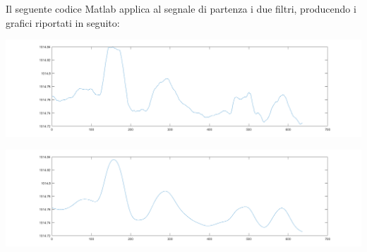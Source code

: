 \documentclass[a4paper]{article}
\begin{document}
Il seguente codice Matlab applica al segnale di partenza i due filtri, producendo i grafici riportati in seguito: \\

\makebox[\linewidth]{}
\makebox[\linewidth]{}
\begin{minipage}{\linewidth}
\begin{center}
\includegraphics[width=160mm,scale=0.7]{./images/segnali/pressure_phone_movmean.png} 
\end{center}
\end{minipage}
\makebox[\linewidth]{}
\makebox[\linewidth]{}
\makebox[\linewidth]{}
\makebox[\linewidth]{}
\begin{minipage}{\linewidth}
\begin{center}
\includegraphics[width=160mm,scale=0.2]{./images/segnali/pressure_phone_gauss.png} 
\end{center}
\end{minipage}



\clearpage

\end{document}
